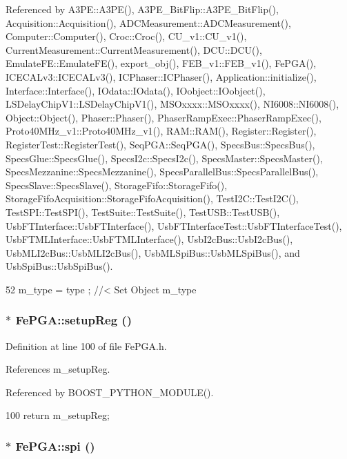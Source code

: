 Referenced by A3PE::A3PE(), A3PE\_\-BitFlip::A3PE\_\-BitFlip(), Acquisition::Acquisition(), ADCMeasurement::ADCMeasurement(), Computer::Computer(), Croc::Croc(), CU\_\-v1::CU\_\-v1(), CurrentMeasurement::CurrentMeasurement(), DCU::DCU(), EmulateFE::EmulateFE(), export\_\-obj(), FEB\_\-v1::FEB\_\-v1(), FePGA(), ICECALv3::ICECALv3(), ICPhaser::ICPhaser(), Application::initialize(), Interface::Interface(), IOdata::IOdata(), IOobject::IOobject(), LSDelayChipV1::LSDelayChipV1(), MSOxxxx::MSOxxxx(), NI6008::NI6008(), Object::Object(), Phaser::Phaser(), PhaserRampExec::PhaserRampExec(), Proto40MHz\_\-v1::Proto40MHz\_\-v1(), RAM::RAM(), Register::Register(), RegisterTest::RegisterTest(), SeqPGA::SeqPGA(), SpecsBus::SpecsBus(), SpecsGlue::SpecsGlue(), SpecsI2c::SpecsI2c(), SpecsMaster::SpecsMaster(), SpecsMezzanine::SpecsMezzanine(), SpecsParallelBus::SpecsParallelBus(), SpecsSlave::SpecsSlave(), StorageFifo::StorageFifo(), StorageFifoAcquisition::StorageFifoAcquisition(), TestI2C::TestI2C(), TestSPI::TestSPI(), TestSuite::TestSuite(), TestUSB::TestUSB(), UsbFTInterface::UsbFTInterface(), UsbFTInterfaceTest::UsbFTInterfaceTest(), UsbFTMLInterface::UsbFTMLInterface(), UsbI2cBus::UsbI2cBus(), UsbMLI2cBus::UsbMLI2cBus(), UsbMLSpiBus::UsbMLSpiBus(), and UsbSpiBus::UsbSpiBus().


\begin{DoxyCode}
52 { m_type  = type  ; } //< Set Object m_type
\end{DoxyCode}
\hypertarget{classFePGA_aa0657c6ef809f3f6b54613f237750cc4}{
\subsubsection[{setupReg}]{$\ast$ FePGA::setupReg ()}}
\label{classFePGA_aa0657c6ef809f3f6b54613f237750cc4}


Definition at line 100 of file FePGA.h.

References m\_\-setupReg.

Referenced by BOOST\_\-PYTHON\_\-MODULE().


\begin{DoxyCode}
100 { return m_setupReg;  }
\end{DoxyCode}
\hypertarget{classFePGA_ab54f9f61e87f1cced6c4ba19eb38a848}{
\subsubsection[{spi}]{$\ast$ FePGA::spi ()}}
\label{classFePGA_ab54f9f61e87f1cced6c4ba19eb38a848}


